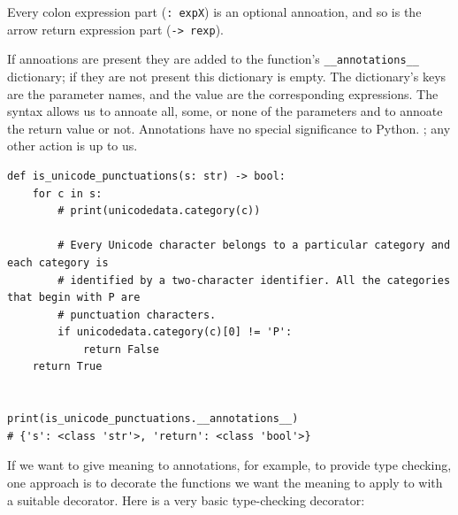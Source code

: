 Every colon expression part (\verb|: expX|) is an optional annoation,
and so is the arrow return expression part (\verb|-> rexp|).


If annoations are present they are added to the function's \verb|__annotations__| dictionary;
if they are not present this dictionary is empty.
The dictionary's keys are the parameter names, and the value are the corresponding expressions.
The syntax allows us to annoate all, some, or none of the parameters and to annoate the return value or not.
Annotations have no special significance to Python.
; any other action is up to us.



\begin{lstlisting}
def is_unicode_punctuations(s: str) -> bool:
    for c in s:
        # print(unicodedata.category(c))

        # Every Unicode character belongs to a particular category and each category is
        # identified by a two-character identifier. All the categories that begin with P are
        # punctuation characters.
        if unicodedata.category(c)[0] != 'P':
            return False
    return True


print(is_unicode_punctuations.__annotations__)
# {'s': <class 'str'>, 'return': <class 'bool'>}
\end{lstlisting}


If we want to give meaning to annotations, for example, to provide type checking,
one approach is to decorate the functions we want the meaning to apply to with a suitable decorator.
Here is a very basic type-checking decorator:

